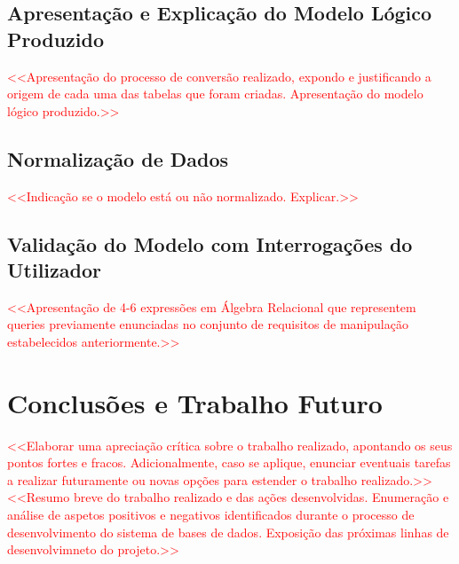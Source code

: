 \documentclass[a4paper,12pt]{scrreprt}
\begin{document}
    \section{Apresentação e Explicação do Modelo Lógico Produzido}
        \textcolor{red}{
            <<Apresentação do processo de conversão realizado, expondo e justificando a origem de cada uma das tabelas que foram criadas. Apresentação do modelo lógico produzido.>>
        }
    \section{Normalização de Dados}
        \textcolor{red}{
            <<Indicação se o modelo está ou não normalizado. Explicar.>>
        }
    \section{Validação do Modelo com Interrogações do Utilizador}
        \textcolor{red}{
            <<Apresentação de 4-6 expressões em Álgebra Relacional que representem queries previamente enunciadas no conjunto de requisitos de manipulação estabelecidos anteriormente.>>
        }



\chapter{Conclusões e Trabalho Futuro}
    \textcolor{red}{
        <<Elaborar uma apreciação crítica sobre o trabalho realizado, apontando os seus pontos fortes e fracos. Adicionalmente, caso se aplique, enunciar eventuais tarefas a realizar futuramente ou novas opções para estender o trabalho realizado.>> \\
        <<Resumo breve do trabalho realizado e das ações desenvolvidas. Enumeração e análise de aspetos positivos e negativos identificados durante o processo de desenvolvimento do sistema de bases de dados. Exposição das próximas linhas de desenvolvimneto do projeto.>>
    }

\end{document}
